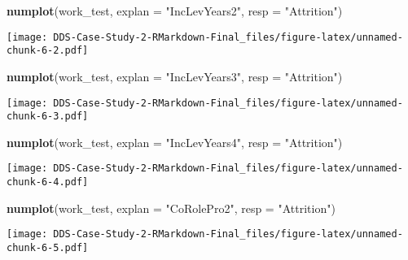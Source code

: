 \documentclass[]{article}
\newenvironment{Shaded}{\begin{snugshade}}{\end{snugshade}}
\newcommand{\CommentTok}[1]{\textcolor[rgb]{0.56,0.35,0.01}{\textit{#1}}}
\newcommand{\DataTypeTok}[1]{\textcolor[rgb]{0.13,0.29,0.53}{#1}}
\newcommand{\KeywordTok}[1]{\textcolor[rgb]{0.13,0.29,0.53}{\textbf{#1}}}
\newcommand{\NormalTok}[1]{#1}
\newcommand{\OperatorTok}[1]{\textcolor[rgb]{0.81,0.36,0.00}{\textbf{#1}}}
\newcommand{\StringTok}[1]{\textcolor[rgb]{0.31,0.60,0.02}{#1}}
\begin{document}
\begin{Shaded}
\begin{Highlighting}[]
\KeywordTok{numplot}\NormalTok{(work_test, }\DataTypeTok{explan =} \StringTok{"IncLevYears2"}\NormalTok{, }\DataTypeTok{resp =} \StringTok{"Attrition"}\NormalTok{)}
\end{Highlighting}
\end{Shaded}

\texttt{[image: DDS-Case-Study-2-RMarkdown-Final\_files/figure-latex/unnamed-chunk-6-2.pdf]}

\begin{Shaded}
\begin{Highlighting}[]
\KeywordTok{numplot}\NormalTok{(work_test, }\DataTypeTok{explan =} \StringTok{"IncLevYears3"}\NormalTok{, }\DataTypeTok{resp =} \StringTok{"Attrition"}\NormalTok{)}
\end{Highlighting}
\end{Shaded}

\texttt{[image: DDS-Case-Study-2-RMarkdown-Final\_files/figure-latex/unnamed-chunk-6-3.pdf]}

\begin{Shaded}
\begin{Highlighting}[]
\KeywordTok{numplot}\NormalTok{(work_test, }\DataTypeTok{explan =} \StringTok{"IncLevYears4"}\NormalTok{, }\DataTypeTok{resp =} \StringTok{"Attrition"}\NormalTok{)}
\end{Highlighting}
\end{Shaded}

\texttt{[image: DDS-Case-Study-2-RMarkdown-Final\_files/figure-latex/unnamed-chunk-6-4.pdf]}

\begin{Shaded}
\begin{Highlighting}[]
\KeywordTok{numplot}\NormalTok{(work_test, }\DataTypeTok{explan =} \StringTok{"CoRolePro2"}\NormalTok{, }\DataTypeTok{resp =} \StringTok{"Attrition"}\NormalTok{)}
\end{Highlighting}
\end{Shaded}

\texttt{[image: DDS-Case-Study-2-RMarkdown-Final\_files/figure-latex/unnamed-chunk-6-5.pdf]}

\begin{Shaded}
\end{Shaded}
\end{document}
